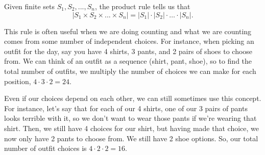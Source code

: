 \documentclass[12pt,letterpaper]{article}
\begin{document}
  Given finite sets $S_1, S_2, ..., S_n$, the product rule tells us that $$|S_1 \times S_2 \times ... \times S_n| = |S_1| \cdot |S_2| \cdot \ldots \cdot|S_n|.$$
  
  This rule is often useful when we are doing counting and what we are counting comes from some number of independent choices. For instance, when picking an outfit for the day, say you have 4 shirts, 3 pants, and 2 pairs of shoes to choose from. We can think of an outfit as a sequence (shirt, pant, shoe), so to find the total number of outfits, we multiply the number of choices we can make for each position, $4 \cdot 3 \cdot 2=24$.
  
  Even if our choices depend on each other, we can still sometimes use this concept. For instance, let's say that for each of our 4 shirts, one of our 3 pairs of pants looks terrible with it, so we don't want to wear those pants if we're wearing that shirt. Then, we still have 4 choices for our shirt, but having made that choice, we now only have 2 pants to choose from. We still have 2 shoe options. So, our total number of outfit choices is $4 \cdot 2 \cdot 2=16$.
  
\end{document}
